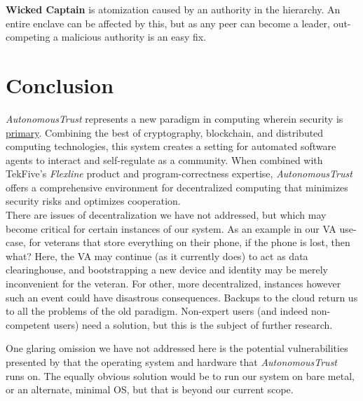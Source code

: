 \documentclass[10pt, twoside]{article}
\newcommand{\projectName}{\emph{AutonomousTrust }}
\newcommand{\analysisName}{\emph{Flexline }}
\begin{document}
\textbf{Wicked Captain} is atomization caused by an authority in the hierarchy. An entire enclave can be affected by this, but as any peer can become a leader, out-competing a malicious authority is an easy fix.


\section{Conclusion}

\projectName represents a new paradigm in computing wherein security is \underline{primary}. Combining the best of cryptography, blockchain, and distributed computing technologies, this system creates a setting for automated software agents to interact and self-regulate as a community. When combined with TekFive's \analysisName product and program-correctness expertise, \projectName offers a comprehensive environment for decentralized computing that minimizes security risks and optimizes cooperation.
\\[10pt]

There are issues of decentralization we have not addressed, but which may become critical for certain instances of our system. As an example in our VA use-case, for veterans that store everything on their phone, if the phone is lost, then what? Here, the VA may continue (as it currently does) to act as data clearinghouse, and bootstrapping a new device and identity may be merely inconvenient for the veteran. For other, more decentralized, instances however such an event could have disastrous consequences. Backups to the cloud return us to all the problems of the old paradigm. Non-expert users (and indeed non-competent users) need a solution, but this is the subject of further research.

One glaring omission we have not addressed here is the potential vulnerabilities presented by that the operating system and hardware that \projectName runs on. The equally obvious solution would be to run our system on bare metal, or an alternate, minimal OS, but that is beyond our current scope.



\end{document}
